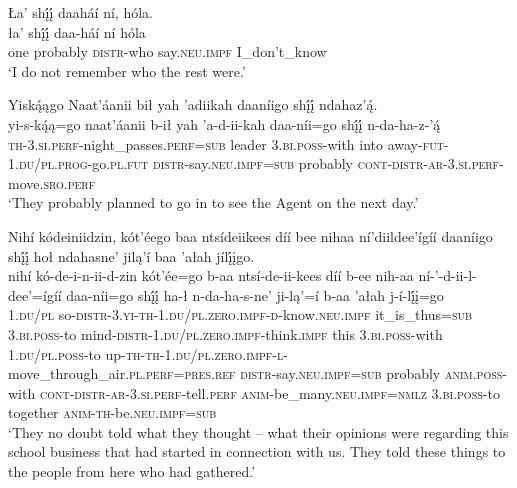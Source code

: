 \ea\label{ex:text1-23-3}
Ła’ shį́į́ daaháí ní, hóla.\\
\gll ła’	shį́į́	daa-háí	ní	hóla\\
     one	probably	\textsc{distr}-who	say.\textsc{neu}.\textsc{impf}	I\_don't\_know\\
\glt `I do not remember who the rest were.'
\z

\ea\label{ex:text1-23-4}
Yiską́ągo Naat’áanii bił yah ’adiikah daaníigo shį́į́ ndahaz’ą́.\\
\gll yi-s-ką́ą=go	naat’áanii	b-ił	yah	’a-d-ii-kah	daa-níi=go	shį́į́	n-da-ha-z-’ą́\\
     \textsc{th}-3.\textsc{si}.\textsc{perf}-night\_passes.\textsc{perf}=\textsc{sub}	leader	3.\textsc{bi}.\textsc{poss}-with	into	away-\textsc{fut}-1.\textsc{du}/\textsc{pl}.\textsc{prog}-go.\textsc{pl}.\textsc{fut}	\textsc{distr}-say.\textsc{neu}.\textsc{impf}=\textsc{sub}	probably	\textsc{cont}-\textsc{distr}-\textsc{ar}-3.\textsc{si}.\textsc{perf}-move.\textsc{sro}.\textsc{perf}\\
\glt `They probably planned to go in to see the Agent on the next day.'
\z

\ea\label{ex:text1-23-5}
Nihí kódeiniidzin, kót’éego baa ntsídeiikees díí bee nihaa ní’diildee’ígíí daaníigo shį́į́ hoł ndahasne’ jilą’í baa ’ałah jílį́įgo.\\
\gll nihí	kó-de-i-n-ii-d-zin	kót’ée=go	b-aa	ntsí-de-ii-kees	díí	b-ee	nih-aa	ní-’-d-ii-l-dee’=ígíí	daa-níi=go	shį́į́	ha-ł	n-da-ha-s-ne’	ji-lą’=í	b-aa	’ałah	j-í-lį́į=go\\
     1.\textsc{du}/\textsc{pl}	so-\textsc{distr}-3.\textsc{yi}-\textsc{th}-1.\textsc{du}/\textsc{pl}.\textsc{zero}.\textsc{impf}-\textsc{d}-know.\textsc{neu}.\textsc{impf}	it\_is\_thus=\textsc{sub}	3.\textsc{bi}.\textsc{poss}-to	mind-\textsc{distr}-1.\textsc{du}/\textsc{pl}.\textsc{zero}.\textsc{impf}-think.\textsc{impf}	this	3.\textsc{bi}.\textsc{poss}-with	1.\textsc{du}/\textsc{pl}.\textsc{poss}-to	up-\textsc{th}-\textsc{th}-1.\textsc{du}/\textsc{pl}.\textsc{zero}.\textsc{impf}-\textsc{l}-move\_through\_air.\textsc{pl}.\textsc{perf}=\textsc{pres}.\textsc{ref}	\textsc{distr}-say.\textsc{neu}.\textsc{impf}=\textsc{sub}	probably	\textsc{anim}.\textsc{poss}-with	\textsc{cont}-\textsc{distr}-\textsc{ar}-3.\textsc{si}.\textsc{perf}-tell.\textsc{perf}	\textsc{anim}-be\_many.\textsc{neu}.\textsc{impf}=\textsc{nmlz}	3.\textsc{bi}.\textsc{poss}-to	together	\textsc{anim}-\textsc{th}-be.\textsc{neu}.\textsc{impf}=\textsc{sub}\\
\glt `They no doubt told what they thought -- what their opinions were regarding this school business that had started in connection with us. They told these things to the people from here who had gathered.'
\z

